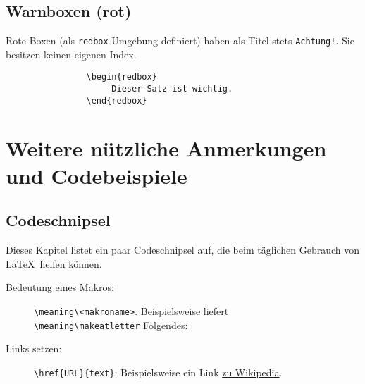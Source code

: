 		\newpage
		\section{Warnboxen (rot)}
			Rote Boxen (als \verb|redbox|-Umgebung definiert) haben als Titel stets \texttt{Achtung!}. Sie besitzen keinen eigenen Index.

			\begin{verbatim}
				\begin{redbox}
				     Dieser Satz ist wichtig.
				\end{redbox}
			\end{verbatim}


	\chapter{Weitere nützliche Anmerkungen und Codebeispiele}
		\section{Codeschnipsel}
			Dieses Kapitel listet ein paar Codeschnipsel auf, die beim täglichen Gebrauch von \LaTeX\ helfen können.
			\begin{description}
				\item[Bedeutung eines Makros:]
					\verb|\meaning\<makroname>|. Beispielsweise liefert\\\verb|\meaning\makeatletter| Folgendes: \texttt{\meaning\makeatletter}
				\item[Links setzen:]
					\verb|\href{URL}{text}|: Beispielsweise ein Link \href{https://de.wikipedia.org/wiki/LaTeX}{zu Wikipedia}.
			\end{description}

